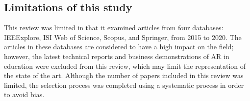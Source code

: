 \subsection{Limitations of this study}
This review was limited in that it examined articles from four databases: IEEExplore, ISI Web of Science, Scopus, and Springer, from 2015 to 2020. The articles in these databases are considered to have a high impact on the field; however, the latest technical reports and business demonstrations of AR in education were excluded from this review, which may limit the representation of the state of the art. Although the number of papers included in this review was limited, the selection process was completed using a systematic process in order to avoid bias.